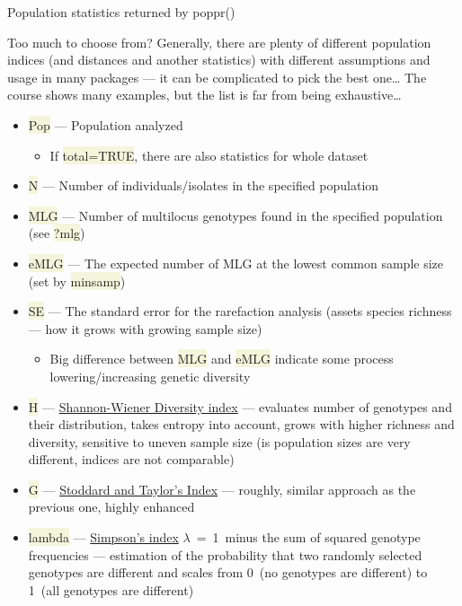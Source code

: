 \documentclass[compress, xelatex, 11pt, xcolor=svgnames, aspectratio=169,
	hyperref={
		bookmarks=true,
		unicode=true,
		colorlinks=true,
		pdftitle={Molecular data in R},
		plainpages=false,
		pdfauthor={Vojtech Zeisek},
		pdfsubject={Course about phylogeny and evolution in R},
		pdfcreator={XeLaTeX},
		pdfkeywords={R, evolution, phylogeny, molecular data},
		linkcolor=Crimson, %
		anchorcolor=Magenta, %
		citecolor=Magenta, %
		filecolor=Magenta, %
		menucolor=Magenta, %
		urlcolor=DodgerBlue, %
		},
	url={hyphens, lowtilde} %
	]{beamer}
\renewcommand{\texttt}[1]{\colorbox{Beige}{{\ttfamily #1}}}
\begin{document}
\begin{frame}[allowframebreaks]{Population statistics returned by poppr()}
	\begin{block}{Too much to choose from?}
		Generally, there are plenty of different population indices (and distances and another statistics) with different assumptions and usage in many packages --- it can be complicated to pick the best one\ldots{ }The course shows many examples, but the list is far from being exhaustive\ldots
	\end{block}
	\begin{itemize}
		\item \texttt{Pop} --- Population analyzed
		\begin{itemize}
			\item If \texttt{total=TRUE}, there are also statistics for whole dataset
		\end{itemize}
		\item \texttt{N} --- Number of individuals/isolates in the specified population
		\item \texttt{MLG} --- Number of multilocus genotypes found in the specified population (see \texttt{?mlg})
		\item \texttt{eMLG} --- The expected number of MLG at the lowest common sample size (set by \texttt{minsamp})
		\item \texttt{SE} --- The standard error for the rarefaction analysis (assets species richness --- how it grows with growing sample size)
		\begin{itemize}
			\item Big difference between \texttt{MLG} and \texttt{eMLG} indicate some process lowering/increasing genetic diversity
		\end{itemize}
		\item \texttt{H} --- \href{https://en.wikipedia.org/wiki/Diversity_index\#Shannon_index}{Shannon-Wiener Diversity index} --- evaluates number of genotypes and their distribution, takes entropy into account, grows with higher richness and diversity, sensitive to uneven sample size (is population sizes are very different, indices are not comparable)
		\item \texttt{G} --- \href{https://academic.oup.com/genetics/article/118/4/705/5997522}{Stoddard and Taylor's Index} --- roughly, similar approach as the previous one, highly enhanced
		\item \texttt{lambda} --- \href{https://en.wikipedia.org/wiki/Diversity_index\#Simpson_index}{Simpson's index} $\lambda$~=~1~minus the sum of squared genotype frequencies --- estimation of the probability that two randomly selected genotypes are different and scales from 0~(no genotypes are different) to 1~(all genotypes are different)

\end{itemize}
\end{frame}
\end{document}
